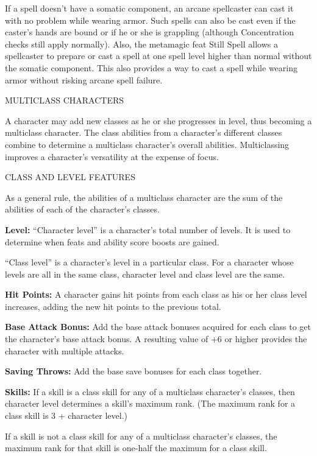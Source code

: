 \documentclass{article}
\begin{document}
If a spell doesn't have a somatic component, an arcane spellcaster can cast it 
with no problem while wearing armor. Such spells can also be cast even if the caster's 
hands are bound or if he or she is grappling (although Concentration checks still 
apply normally). Also, the metamagic feat Still Spell allows a spellcaster to prepare 
or cast a spell at one spell level higher than normal without the somatic component. 
This also provides a way to cast a spell while wearing armor without risking arcane 
spell failure. 

\vspace{12pt}
{\LARGE{}MULTICLASS CHARACTERS}

A character may add new classes as he or she progresses in level, thus becoming 
a multiclass character. The class abilities from a character's different classes 
combine to determine a multiclass character's overall abilities. Multiclassing 
improves a character's versatility at the expense of focus.

\vspace{12pt}
CLASS AND LEVEL FEATURES

As a general rule, the abilities of a multiclass character are the sum of the abilities 
of each of the character's classes.

\textbf{Level:} ``Character level'' is a character's total number of levels. It 
is used to determine when feats and ability score boosts are gained.

``Class level'' is a character's level in a particular class. For a character whose 
levels are all in the same class, character level and class level are the same.

\textbf{Hit Points:} A character gains hit points from each class as his or her 
class level increases, adding the new hit points to the previous total. 

\textbf{Base Attack Bonus:} Add the base attack bonuses acquired for each class 
to get the character's base attack bonus. A resulting value of +6 or higher provides 
the character with multiple attacks. 

\textbf{Saving Throws:} Add the base save bonuses for each class together.

\textbf{Skills:} If a skill is a class skill for any of a multiclass character's 
classes, then character level determines a skill's maximum rank. (The maximum rank 
for a class skill is 3 + character level.)

If a skill is not a class skill for any of a multiclass character's classes, the 
maximum rank for that skill is one-half the maximum for a class skill.
\end{document}
